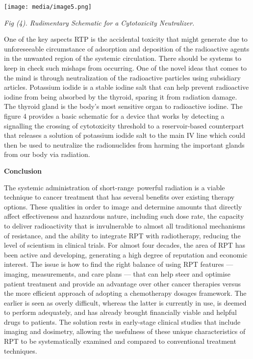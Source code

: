 \documentclass[
]{article}
\begin{document}
\texttt{[image: media/image5.png]}

\emph{Fig (4). Rudimentary Schematic for a Cytotoxicity Neutralizer.}

One of the key aspects RTP is the accidental toxicity that might
generate due to unforeseeable circumstance of adsorption and deposition
of the radioactive agents in the unwanted region of the systemic
circulation. There should be systems to keep in check such mishaps from
occurring. One of the novel ideas that comes to the mind is through
neutralization of the radioactive particles using subsidiary articles.
Potassium iodide is a stable iodine salt that can help prevent
radioactive iodine from being absorbed by the thyroid, sparing it from
radiation damage. The thyroid gland is the body's most sensitive organ
to radioactive iodine. The figure 4 provides a basic schematic for a
device that works by detecting a signalling the crossing of cytotoxicity
threshold to a reservoir-based counterpart that releases a solution of
potassium iodide salt to the main IV line which could then be used to
neutralize the radionuclides from harming the important glands from our
body via radiation.

\textbf{Conclusion}

The systemic administration of short-range~powerful radiation is a
viable technique to cancer treatment that has several benefits over
existing therapy options. These qualities in order to image and
determine amounts that directly affect effectiveness and hazardous
nature, including such dose rate, the capacity to deliver radioactivity
that is invulnerable to almost all traditional mechanisms of resistance,
and the ability to integrate RPT with radiotherapy, reducing the level
of scientism in clinical trials. For almost four decades, the area of
RPT has been active and developing, generating a high degree of
reputation and economic interest. The issue is how to find the right
balance of using RPT features --- imaging, measurements, and care plans
--- that can help steer and optimise patient treatment and provide an
advantage over other cancer therapies versus the more efficient approach
of adopting a chemotherapy dosages framework. The earlier is seen as
overly difficult, whereas the latter is currently in use, is deemed to
perform adequately, and has already brought financially viable and
helpful drugs to patients. The solution rests in early-stage clinical
studies that include imaging and dosimetry, allowing the usefulness of
these unique characteristics of RPT to be systematically examined and
compared to conventional treatment techniques.
\end{document}
